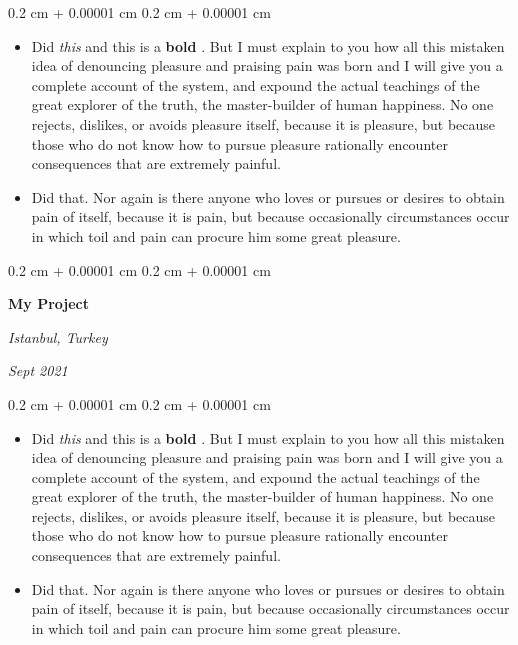 \documentclass[10pt, letterpaper]{article}
\newenvironment{highlights}{
    \begin{itemize}[
        topsep=0.10 cm,
        parsep=0.10 cm,
        partopsep=0pt,
        itemsep=0pt,
        leftmargin=0.4 cm + 10pt
    ]
}{
    \end{itemize}
} %
\newenvironment{onecolentry}{
    \begin{adjustwidth}{
        0.2 cm + 0.00001 cm
    }{
        0.2 cm + 0.00001 cm
    }
}{
    \end{adjustwidth}
} %
\newenvironment{twocolentry}[2][]{
    \onecolentry
    \def\secondColumn{#2}
    \setcolumnwidth{\fill, 4.5 cm}
    \begin{paracol}{2}
}{
    \switchcolumn \raggedleft \secondColumn
    \end{paracol}
    \endonecolentry
} %
\let\hrefWithoutArrow\href
\renewcommand{\href}[2]{\hrefWithoutArrow{#1}{\ifthenelse{\equal{#2}{}}{ }{#2 }\raisebox{.15ex}{\footnotesize \faExternalLink*}}}
\begin{document}
        \vspace{0.10 cm}
        \begin{onecolentry}
            \begin{highlights}
                \item Did \textit{this} and this is a \textbf{bold} \href{https://example.com}{link}. But I must explain to you how all this mistaken idea of denouncing pleasure and praising pain was born and I will give you a complete account of the system, and expound the actual teachings of the great explorer of the truth, the master-builder of human happiness. No one rejects, dislikes, or avoids pleasure itself, because it is pleasure, but because those who do not know how to pursue pleasure rationally encounter consequences that are extremely painful.
                \item Did that. Nor again is there anyone who loves or pursues or desires to obtain pain of itself, because it is pain, but because occasionally circumstances occur in which toil and pain can procure him some great pleasure.
            \end{highlights}
        \end{onecolentry}


        \vspace{0.2 cm}

        \begin{twocolentry}{
        \textit{Istanbul, Turkey}    
            
        \textit{Sept 2021}}
            \textbf{My Project}
        \end{twocolentry}

        \vspace{0.10 cm}
        \begin{onecolentry}
            \begin{highlights}
                \item Did \textit{this} and this is a \textbf{bold} \href{https://example.com}{link}. But I must explain to you how all this mistaken idea of denouncing pleasure and praising pain was born and I will give you a complete account of the system, and expound the actual teachings of the great explorer of the truth, the master-builder of human happiness. No one rejects, dislikes, or avoids pleasure itself, because it is pleasure, but because those who do not know how to pursue pleasure rationally encounter consequences that are extremely painful.
                \item Did that. Nor again is there anyone who loves or pursues or desires to obtain pain of itself, because it is pain, but because occasionally circumstances occur in which toil and pain can procure him some great pleasure.
            \end{highlights}
        \end{onecolentry}
\end{document}
